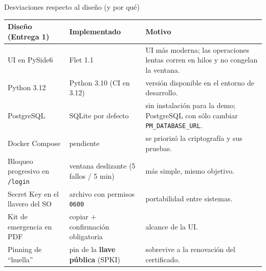 \documentclass[aspectratio=169,10pt]{beamer}
\begin{document}
\begin{frame}{Desviaciones respecto al diseño (y por qué)}
  \centering\scriptsize
  \renewcommand{\arraystretch}{1.05}
  \begin{tabular}{@{}p{} p{} p{}@{}}
    \toprule
    \textbf{Diseño (Entrega 1)} & \textbf{Implementado} & \textbf{Motivo} \\
    \midrule
    UI en PySide6 & Flet 1.1 & UI más moderna; las operaciones lentas corren en hilos y no congelan la ventana. \\
    Python 3.12 & Python 3.10 (CI en 3.12) & versión disponible en el entorno de desarrollo. \\
    PostgreSQL & SQLite por defecto & sin instalación para la demo; PostgreSQL con sólo cambiar \texttt{PM\_DATABASE\_URL}. \\
    Docker Compose & pendiente & se priorizó la criptografía y sus pruebas. \\
    Bloqueo progresivo en \texttt{/login} & ventana deslizante (5 fallos / 5 min) & más simple, mismo objetivo. \\
    Secret Key en el llavero del SO & archivo con permisos \texttt{0600} & portabilidad entre sistemas. \\
    Kit de emergencia en PDF & copiar $+$ confirmación obligatoria & alcance de la UI. \\
    Pinning de ``huella'' & pin de la \textbf{llave pública} (SPKI) & sobrevive a la renovación del certificado. \\
    \bottomrule
  \end{tabular}
\end{frame}
\end{document}
